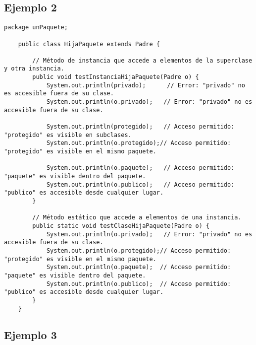 \documentclass[a4paper,12pt]{article}
\begin{document}
\subsection{Ejemplo 2}
\begin{lstlisting}[style=customjava]
    package unPaquete;
    
    public class HijaPaquete extends Padre {
    
        // Método de instancia que accede a elementos de la superclase y otra instancia.
        public void testInstanciaHijaPaquete(Padre o) {
            System.out.println(privado);      // Error: "privado" no es accesible fuera de su clase.
            System.out.println(o.privado);   // Error: "privado" no es accesible fuera de su clase.
    
            System.out.println(protegido);   // Acceso permitido: "protegido" es visible en subclases.
            System.out.println(o.protegido);// Acceso permitido: "protegido" es visible en el mismo paquete.
    
            System.out.println(o.paquete);   // Acceso permitido: "paquete" es visible dentro del paquete.
            System.out.println(o.publico);   // Acceso permitido: "publico" es accesible desde cualquier lugar.
        }
    
        // Método estático que accede a elementos de una instancia.
        public static void testClaseHijaPaquete(Padre o) {
            System.out.println(o.privado);   // Error: "privado" no es accesible fuera de su clase.
            System.out.println(o.protegido);// Acceso permitido: "protegido" es visible en el mismo paquete.
            System.out.println(o.paquete);  // Acceso permitido: "paquete" es visible dentro del paquete.
            System.out.println(o.publico);  // Acceso permitido: "publico" es accesible desde cualquier lugar.
        }
    }
    \end{lstlisting}

\subsection{Ejemplo 3}
\end{document}
